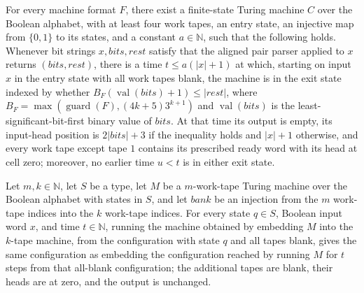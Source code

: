 \begin{lemma}
\label{Turing.MachineFormat.exists_canonGuardFrontStrict}
\leanok
{}
For every machine format $F$, there exist a finite-state Turing machine $C$ over the
Boolean alphabet, with at least four work tapes, an entry state, an injective map from
$\{0,1\}$ to its states, and a constant $a\in\mathbb N$, such that the following
holds. Whenever bit strings $x,bits,rest$ satisfy that the aligned pair parser applied
to $x$ returns $(bits,rest)$, there is a time $t\le a(|x|+1)$ at which, starting on
input $x$ in the entry state with all work tapes blank, the machine is in the exit state
indexed by whether $B_F(\operatorname{val}(bits)+1)\le |rest|$, where
$B_F=\max(\operatorname{guard}(F),(4k+5)3^{k+1})$ and $\operatorname{val}(bits)$ is
the least-significant-bit-first binary value of $bits$. At that time its output is
empty, its input-head position is $2|bits|+3$ if the inequality holds and $|x|+1$
otherwise, and every work tape except tape $1$ contains its prescribed ready word with
its head at cell zero; moreover, no earlier time $u<t$ is in either exit state.
\end{lemma}

\begin{lemma}
\label{Turing.MachineFormat.canonBlankLift}
\leanok
{}
Let $m,k\in\mathbb{N}$, let $S$ be a type, let $M$ be a $m$-work-tape Turing machine
over the Boolean alphabet with states in $S$, and let $bank$ be an injection from the
$m$ work-tape indices into the $k$ work-tape indices. For every state $q\in S$, Boolean
input word $x$, and time $t\in\mathbb{N}$, running the machine obtained by embedding $M$
into the $k$-tape machine, from the configuration with state $q$ and all tapes blank,
gives the same configuration as embedding the configuration reached by running $M$ for
$t$ steps from that all-blank configuration; the additional tapes are blank, their heads
are at zero, and the output is unchanged.
\end{lemma}

